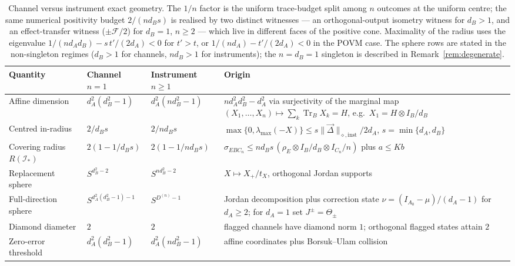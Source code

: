 \documentclass[11pt,a4paper]{article}
\newcommand{\Tr}{\operatorname{Tr}}
\newcommand{\vD}{\vec{\Delta}}
\begin{document}
\begin{table}[t]
\centering
\small
\setlength{\tabcolsep}{4pt}
\begin{tabular}{p{3.4cm}p{3.0cm}p{3.0cm}p{3.4cm}}
\toprule
Quantity & Channel $n=1$ & Instrument $n\ge1$ & Origin \\
\midrule
Affine dimension & $d_A^2(d_B^2-1)$ & $d_A^2(nd_B^2-1)$ & $nd_A^2d_B^2-d_A^2$ via surjectivity of the marginal map $(X_1,\dots,X_n)\mapsto\sum_k\Tr_BX_k=H$, e.g.\ $X_1=H\otimes I_B/d_B$\\
Centred in-radius & $2/d_Bs$ & $2/nd_Bs$ & $\max\{0,\lambda_{\max}(-X)\}\le s\|\vD\|_{\diamond,\mathrm{inst}}/2d_A$, $s=\min\{d_A,d_B\}$\\
Covering radius $R(\mathcal I_*)$ & $2(1-1/d_Bs)$ & $2(1-1/nd_Bs)$ & $\sigma_{EBC_n}\le nd_Bs\,(\rho_E\otimes I_B/d_B\otimes I_{C_n}/n)$ plus $a\le Kb$\\
Replacement sphere & $S^{d_B^2-2}$ & $S^{nd_B^2-2}$ & $X\mapsto X_+/t_X$, orthogonal Jordan supports\\
Full-direction sphere & $S^{d_A^2(d_B^2-1)-1}$ & $S^{D^{(n)}-1}$ & Jordan decomposition plus correction state $\nu=(I_{A_0}-\mu)/(d_A-1)$ for $d_A\ge2$; for $d_A=1$ set $J^\pm=\Theta_\pm$\\
Diamond diameter & $2$ & $2$ & flagged channels have diamond norm $1$; orthogonal flagged states attain $2$\\
Zero-error threshold & $d_A^2(d_B^2-1)$ & $d_A^2(nd_B^2-1)$ & affine coordinates plus Borsuk--Ulam collision\\
\bottomrule
\end{tabular}
\caption{Channel versus instrument exact geometry. The $1/n$ factor is the uniform trace-budget split among $n$ outcomes at the uniform centre; the same numerical positivity budget $2/(nd_Bs)$ is realised by two distinct witnesses --- an orthogonal-output isometry witness for $d_B>1$, and an effect-transfer witness ($\pm\mathcal F/2$) for $d_B=1$, $n\ge2$ --- which live in different faces of the positive cone. Maximality of the radius uses the eigenvalue $1/(nd_Ad_B)-s\,t'/(2d_A)<0$ for $t'>t$, or $1/(nd_A)-t'/(2d_A)<0$ in the POVM case. The sphere rows are stated in the non-singleton regimes ($d_B>1$ for channels, $nd_B>1$ for instruments); the $n=d_B=1$ singleton is described in Remark~\ref{rem:degenerate}.}
\label{tab:comparison}
\end{table}
\end{document}

